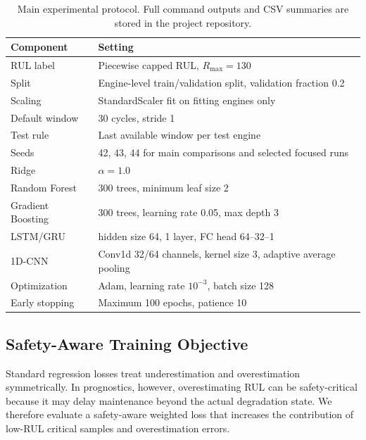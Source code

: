 \documentclass[11pt,a4paper]{article}
\begin{document}
\begin{table}[htbp]
\centering
\caption{Main experimental protocol. Full command outputs and CSV summaries are stored in the project repository.}
\label{tab:protocol}
\begin{tabular}{ll}
\toprule
Component & Setting \\
\midrule
RUL label & Piecewise capped RUL, \(R_{\max}=130\) \\
Split & Engine-level train/validation split, validation fraction 0.2 \\
Scaling & StandardScaler fit on fitting engines only \\
Default window & 30 cycles, stride 1 \\
Test rule & Last available window per test engine \\
Seeds & 42, 43, 44 for main comparisons and selected focused runs \\
Ridge & \(\alpha=1.0\) \\
Random Forest & 300 trees, minimum leaf size 2 \\
Gradient Boosting & 300 trees, learning rate 0.05, max depth 3 \\
LSTM/GRU & hidden size 64, 1 layer, FC head 64--32--1 \\
1D-CNN & Conv1d 32/64 channels, kernel size 3, adaptive average pooling \\
Optimization & Adam, learning rate \(10^{-3}\), batch size 128 \\
Early stopping & Maximum 100 epochs, patience 10 \\
\bottomrule
\end{tabular}
\end{table}

\subsection{Safety-Aware Training Objective}

Standard regression losses treat underestimation and overestimation symmetrically. In prognostics, however, overestimating RUL can be safety-critical because it may delay maintenance beyond the actual degradation state. We therefore evaluate a safety-aware weighted loss that increases the contribution of low-RUL critical samples and overestimation errors.
\end{document}
